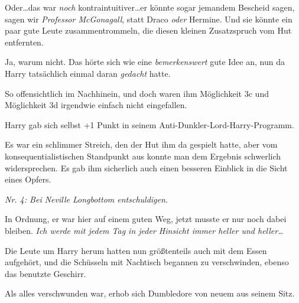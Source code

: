 Oder…das war \emph{noch} kontraintuitiver…er könnte sogar jemandem Bescheid sagen, sagen wir \emph{Professor McGonagall}, statt Draco \emph{oder} Hermine. Und sie könnte ein paar gute Leute zusammentrommeln, die diesen kleinen Zusatzspruch vom Hut entfernten.

Ja, warum nicht. Das hörte sich wie eine \emph{bemerkenswert} gute Idee an, nun da Harry tatsächlich einmal daran \emph{gedacht} hatte.

So offensichtlich im Nachhinein, und doch waren ihm Möglichkeit 3c und Möglichkeit 3d irgendwie einfach nicht eingefallen.

Harry gab sich selbst +1 Punkt in seinem Anti-Dunkler-Lord-Harry-Programm.

Es war ein schlimmer Streich, den der Hut ihm da gespielt hatte, aber vom konsequentialistischen Standpunkt aus konnte man dem Ergebnis schwerlich widersprechen. Es gab ihm sicherlich auch einen besseren Einblick in die Sicht eines Opfers.

\emph{Nr. 4: Bei Neville Longbottom entschuldigen.}

In Ordnung, er war hier auf einem guten Weg, jetzt musste er nur noch dabei bleiben. \emph{Ich werde mit jedem Tag in jeder Hinsicht immer heller und heller…}

Die Leute um Harry herum hatten nun größtenteils auch mit dem Essen aufgehört, und die Schüsseln mit Nachtisch begannen zu verschwinden, ebenso das benutzte Geschirr.

Als alles verschwunden war, erhob sich Dumbledore von neuem aus seinem Sitz.

